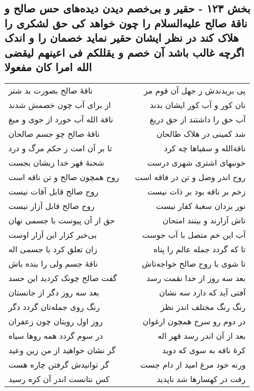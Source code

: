 \begin{center}
\section*{بخش ۱۲۳ - حقیر و بی‌خصم دیدن دیده‌های حس صالح و ناقهٔ صالح علیه‌السلام را چون خواهد کی حق لشکری را هلاک کند در نظر ایشان حقیر نماید خصمان را و اندک اگرچه غالب باشد آن خصم و یقللکم فی اعینهم لیقضی الله امرا کان مفعولا}
\label{sec:sh123}
\begin{longtable}{l p{0.5cm} r}
ناقهٔ صالح بصورت بد شتر
&&
پی بریدندش ز جهل آن قوم مر
\\
از برای آب چون خصمش شدند
&&
نان کور و آب کور ایشان بدند
\\
ناقة الله آب خورد از جوی و میغ
&&
آب حق را داشتند از حق دریغ
\\
ناقهٔ صالح چو جسم صالحان
&&
شد کمینی در هلاک طالحان
\\
تا بر آن امت ز حکم مرگ و درد
&&
ناقةالله و سقیاها چه کرد
\\
شحنهٔ قهر خدا زیشان بجست
&&
خونبهای اشتری شهری درست
\\
روح همچون صالح و تن ناقه است
&&
روح اندر وصل و تن در فاقه است
\\
روح صالح قابل آفات نیست
&&
زخم بر ناقه بود بر ذات نیست
\\
روح صالح قابل آزار نیست
&&
نور یزدان سغبهٔ کفار نیست
\\
حق از آن پیوست با جسمی نهان
&&
تاش آزارند و بینند امتحان
\\
بی‌خبر کزار این آزار اوست
&&
آب این خم متصل با آب جوست
\\
زان تعلق کرد با جسمی اله
&&
تا که گردد جمله عالم را پناه
\\
ناقهٔ جسم ولی را بنده باش
&&
تا شوی با روح صالح خواجه‌تاش
\\
گفت صالح چونک کردید این حسد
&&
بعد سه روز از خدا نقمت رسد
\\
بعد سه روز دگر از جانستان
&&
آفتی آید که دارد سه نشان
\\
رنگ روی جمله‌تان گردد دگر
&&
رنگ رنگ مختلف اندر نظر
\\
روز اول رویتان چون زعفران
&&
در دوم رو سرخ همچون ارغوان
\\
در سوم گردد همه روها سیاه
&&
بعد از آن اندر رسد قهر اله
\\
گر نشان خواهید از من زین وعید
&&
کرهٔ ناقه به سوی که دوید
\\
گر توانیدش گرفتن چاره هست
&&
ورنه خود مرغ امید از دام جست
\\
کس نتانست اندر آن کره رسید
&&
رفت در کهسارها شد ناپدید

\end{longtable}
\end{center}
